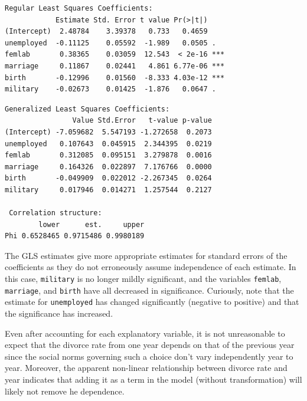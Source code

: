 \documentclass{homework}
\begin{document}
\begin{longproblem}
\begin{minipage}{.5\textwidth}
\vspace{-3em}
{\footnotesize
\begin{verbatim}
Regular Least Squares Coefficients:
            Estimate Std. Error t value Pr(>|t|)    
(Intercept)  2.48784    3.39378   0.733   0.4659    
unemployed  -0.11125    0.05592  -1.989   0.0505 .  
femlab       0.38365    0.03059  12.543  < 2e-16 ***
marriage     0.11867    0.02441   4.861 6.77e-06 ***
birth       -0.12996    0.01560  -8.333 4.03e-12 ***
military    -0.02673    0.01425  -1.876   0.0647 .  
\end{verbatim}
}
\end{minipage}
\begin{minipage}{.5\textwidth}
{\footnotesize
\begin{verbatim}
Generalized Least Squares Coefficients:
                Value Std.Error   t-value p-value
(Intercept) -7.059682  5.547193 -1.272658  0.2073
unemployed   0.107643  0.045915  2.344395  0.0219
femlab       0.312085  0.095151  3.279878  0.0016
marriage     0.164326  0.022897  7.176766  0.0000
birth       -0.049909  0.022012 -2.267345  0.0264
military     0.017946  0.014271  1.257544  0.2127

 Correlation structure:
        lower      est.     upper
Phi 0.6528465 0.9715486 0.9980189
\end{verbatim}
}
\end{minipage}

The GLS estimates give more appropriate estimates for standard errors of the coefficients as they do not erroneously assume independence of each estimate.  In this case, \texttt{military} is no longer mildly significant, and the variables \texttt{femlab}, \texttt{marriage}, and \texttt{birth} have all decreased in significance.  Curiously, note that the estimate for \texttt{unemployed} has changed significantly (negative to positive) and that the significance has increased.


Even after accounting for each explanatory variable, it is not unreasonable to expect that the divorce rate from one year depends on that of the previous year since the social norms governing such a choice don't vary independently year to year.  Moreover, the apparent non-linear relationship between divorce rate and year indicates that adding it as a term in the model (without transformation) will likely not remove he dependence. 
\end{longproblem}
\newpage
\end{document}
